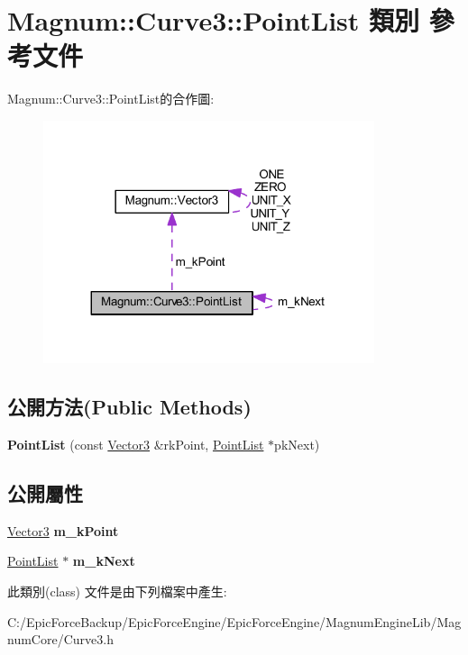 \hypertarget{class_magnum_1_1_curve3_1_1_point_list}{}\section{Magnum\+:\+:Curve3\+:\+:Point\+List 類別 參考文件}
\label{class_magnum_1_1_curve3_1_1_point_list}


Magnum\+:\+:Curve3\+:\+:Point\+List的合作圖\+:\nopagebreak
\begin{figure}[H]
\begin{center}
\leavevmode
\includegraphics[width=275pt]{class_magnum_1_1_curve3_1_1_point_list__coll__graph}
\end{center}
\end{figure}
\subsection*{公開方法(Public Methods)}
\begin{DoxyCompactItemize}
\item 
{\bfseries Point\+List} (const \hyperlink{class_magnum_1_1_vector3}{Vector3} \&rk\+Point, \hyperlink{class_magnum_1_1_curve3_1_1_point_list}{Point\+List} $\ast$pk\+Next)\hypertarget{class_magnum_1_1_curve3_1_1_point_list_a0f8311ee0db5e9668aa5ebf82dae56c2}{}\label{class_magnum_1_1_curve3_1_1_point_list_a0f8311ee0db5e9668aa5ebf82dae56c2}

\end{DoxyCompactItemize}
\subsection*{公開屬性}
\begin{DoxyCompactItemize}
\item 
\hyperlink{class_magnum_1_1_vector3}{Vector3} {\bfseries m\+\_\+k\+Point}\hypertarget{class_magnum_1_1_curve3_1_1_point_list_a55173ac01de3b62718dfe5e63ac849fa}{}\label{class_magnum_1_1_curve3_1_1_point_list_a55173ac01de3b62718dfe5e63ac849fa}

\item 
\hyperlink{class_magnum_1_1_curve3_1_1_point_list}{Point\+List} $\ast$ {\bfseries m\+\_\+k\+Next}\hypertarget{class_magnum_1_1_curve3_1_1_point_list_a37db712d321f93504d7a8bffa8d0a9a4}{}\label{class_magnum_1_1_curve3_1_1_point_list_a37db712d321f93504d7a8bffa8d0a9a4}

\end{DoxyCompactItemize}


此類別(class) 文件是由下列檔案中產生\+:\begin{DoxyCompactItemize}
\item 
C\+:/\+Epic\+Force\+Backup/\+Epic\+Force\+Engine/\+Epic\+Force\+Engine/\+Magnum\+Engine\+Lib/\+Magnum\+Core/Curve3.\+h\end{DoxyCompactItemize}
